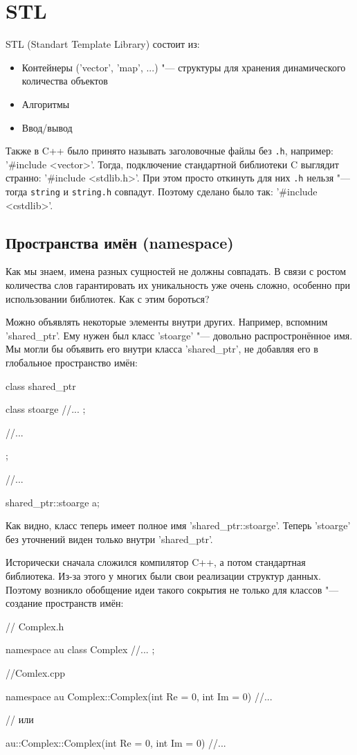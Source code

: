 \chapter{STL}

STL (Standart Template Library) состоит из:
\begin{itemize}
	\item Контейнеры (\cpp'vector', \cpp'map', ...) "--- структуры для хранения динамического количества объектов
	\item Алгоритмы
	\item Ввод/вывод
\end{itemize}
 
Также в C++ было принято называть заголовочные файлы без \verb'.h', например: \cpp'#include <vector>'.
Тогда, подключение стандартной библиотеки C выглядит странно: \cpp'#include <stdlib.h>'.
При этом просто откинуть для них \verb'.h' нельзя "--- тогда \verb'string' и \verb'string.h' совпадут.
Поэтому сделано было так: \cpp'#include <cstdlib>'.
 
\section{Пространства имён (namespace)}
 
Как мы знаем, имена разных сущностей не должны совпадать. В связи с ростом количества слов гарантировать их уникальность уже очень сложно, особенно при использовании библиотек. Как с этим бороться?
 
Можно объявлять некоторые элементы внутри других.
Например, вспомним \cpp'shared_ptr'.
Ему нужен был класс \cpp'stoarge' "--- довольно распростронённое имя.
Мы могли бы объявить его внутри класса \cpp'shared_ptr', не добавляя его в глобальное пространство имён:
\begin{cppcode}
class shared_ptr {
	class stoarge {
		//...
	};
 
	//...
};
 
//...
 
shared_ptr::stoarge a;
\end{cppcode}
Как видно, класс теперь имеет полное имя \cpp'shared_ptr::stoarge'.
Теперь \cpp'stoarge' без уточнений виден только внутри \cpp'shared_ptr'.
 
Исторически сначала сложился компилятор C++, а потом стандартная библиотека. Из-за этого у многих были свои реализации структур данных.
Поэтому возникло обобщение идеи такого сокрытия не только для классов "--- создание пространств имён:
\begin{cppcode}
// Complex.h
 
namespace au {
	class Complex {
		//...
	};
}
 
//Comlex.cpp
 
namespace au {
	Complex::Complex(int Re = 0, int Im = 0) {
		//...
	}
}
 
// или
 
au::Complex::Complex(int Re = 0, int Im = 0) {
	//...
}
\end{cppcode}
 
